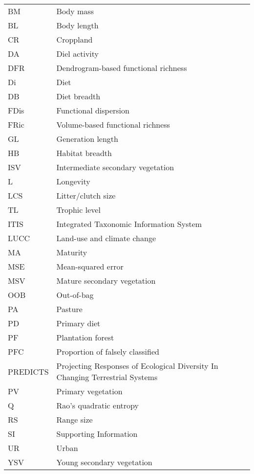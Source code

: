 \begin{table}[h!]
\renewcommand{\baselinestretch}{1.1}
\renewcommand{\arraystretch}{1}
\fontsize{10}{11}\selectfont
\begin{tabular}{ll}
BM & Body mass\\
BL & Body length\\
CR & Croppland \\
DA & Diel activity\\
DFR & Dendrogram-based functional richness\\
Di & Diet\\
DB & Diet breadth\\
FDis & Functional dispersion\\
FRic & Volume-based functional richness\\
GL & Generation length\\
HB & Habitat breadth\\
ISV & Intermediate secondary vegetation \\
L & Longevity\\
LCS & Litter/clutch size\\
TL & Trophic level\\
ITIS & Integrated Taxonomic Information System\\
LUCC & Land-use and climate change\\
MA & Maturity\\
MSE & Mean-squared error\\
MSV & Mature secondary vegetation \\
OOB & Out-of-bag \\
PA & Pasture \\
PD & Primary diet\\
PF & Plantation forest \\
PFC & Proportion of falsely classified\\
PREDICTS & Projecting Responses of Ecological Diversity In Changing Terrestrial Systems\\
PV & Primary vegetation \\
Q & Rao's quadratic entropy\\
RS & Range size\\
SI & Supporting Information \\
UR & Urban \\
YSV & Young secondary vegetation
\end{tabular}
\end{table}